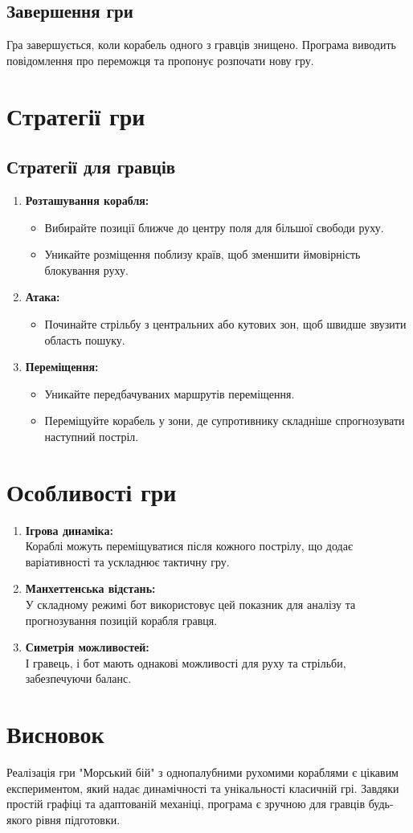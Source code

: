 \documentclass[12pt]{article}
\begin{document}
\subsection{Завершення гри}
Гра завершується, коли корабель одного з гравців знищено. Програма виводить повідомлення про переможця та пропонує розпочати нову гру.

\section{Стратегії гри}
\subsection{Стратегії для гравців}
\begin{enumerate}
    \item \textbf{Розташування корабля:}
    \begin{itemize}
        \item Вибирайте позиції ближче до центру поля для більшої свободи руху.
        \item Уникайте розміщення поблизу країв, щоб зменшити ймовірність блокування руху. \hspace{0pt} \\
    \end{itemize}
    \item \textbf{Атака:}
    \begin{itemize}
        \item Починайте стрільбу з центральних або кутових зон, щоб швидше звузити область пошуку.
    \end{itemize}
    \item \textbf{Переміщення:}
    \begin{itemize}
        \item Уникайте передбачуваних маршрутів переміщення.
        \item Переміщуйте корабель у зони, де супротивнику складніше спрогнозувати наступний постріл.
    \end{itemize}
\end{enumerate}

\section{Особливості гри}
\begin{enumerate}
    \item \textbf{Ігрова динаміка:} \\
    Кораблі можуть переміщуватися після кожного пострілу, що додає варіативності та ускладнює тактичну гру.
    \item \textbf{Манхеттенська відстань:} \\
    У складному режимі бот використовує цей показник для аналізу та прогнозування позицій корабля гравця.
    \item \textbf{Симетрія можливостей:} \\
    І гравець, і бот мають однакові можливості для руху та стрільби, забезпечуючи баланс.
\end{enumerate}


\section{Висновок}
Реалізація гри "Морський бій" з однопалубними рухомими кораблями є цікавим експериментом, який надає динамічності та унікальності класичній грі. Завдяки простій графіці та адаптованій механіці, програма є зручною для гравців будь-якого рівня підготовки.
\end{document}
